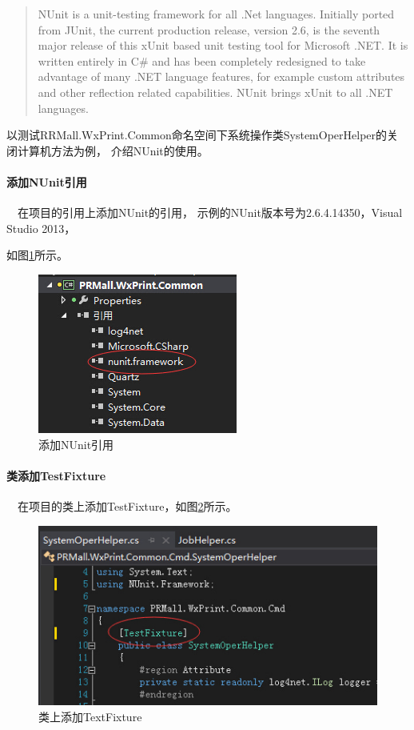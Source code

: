 \documentclass{book}
\begin{document}
\begin{quotation}
NUnit is a unit-testing framework for all .Net languages. Initially ported from JUnit, 
the current production release, version 2.6, is the seventh major release of this xUnit 
based unit testing tool for Microsoft .NET. It is written entirely in C\# and has been 
completely redesigned to take advantage of many .NET language features, for example custom 
attributes and other reflection related capabilities. NUnit brings xUnit to all .NET languages.
\end{quotation}

以测试RRMall.WxPrint.Common命名空间下系统操作类SystemOperHelper的关闭计算机方法为例，
介绍NUnit的使用。

\paragraph{添加NUnit引用}~~在项目的引用上添加NUnit的引用，
示例的NUnit版本号为2.6.4.14350，Visual Studio 2013，

如图\ref{AddNUnitReference}所示。

\begin{figure}[htbp]
	\centering
	\includegraphics[scale=1]{AddNUnitReference.jpg}
	\caption{添加NUnit引用}
	\label{AddNUnitReference}
\end{figure}
	
\paragraph{类添加TestFixture}~~在项目的类上添加TestFixture，如图\ref{AddTextFixtureToClass}所示。

\begin{figure}[htbp]
	\centering
	\includegraphics[scale=1]{AddTextFixtureToClass.jpg}
	\caption{类上添加TextFixture}
	\label{AddTextFixtureToClass}
\end{figure}
\end{document}
